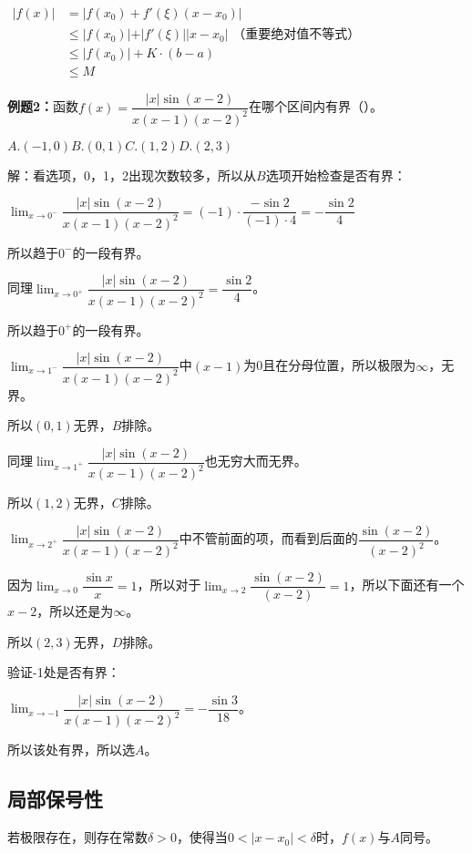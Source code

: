 \documentclass[UTF8]{ctexart}
\begin{document}
$
\begin{aligned}
    \vert f(x)\vert & =\vert f(x_0)+f'(\xi)(x-x_0)\vert \\
    & \leqslant\vert f(x_0)\vert+\vert f'(\xi)\vert\vert x-x_0\vert\text{ （重要绝对值不等式）} \\
    & \leqslant\vert f(x_0)\vert+K\cdot(b-a) \\
    & \leqslant M
\end{aligned}
$

\textbf{例题2：}函数$f(x)=\dfrac{\vert x\vert\sin(x-2)}{x(x-1)(x-2)^2}$在哪个区间内有界（）。

$A.(-1,0)$\qquad$B.(0,1)$\qquad$C.(1,2)$\qquad$D.(2,3)$

解：看选项，0，1，2出现次数较多，所以从$B$选项开始检查是否有界：

$\lim_{x\to 0^-}\dfrac{\vert x\vert\sin(x-2)}{x(x-1)(x-2)^2}=(-1)\cdot\dfrac{-\sin 2}{(-1)\cdot 4}=-\dfrac{\sin 2}{4}$

所以趋于$0^-$的一段有界。

同理$\lim_{x\to 0^+}\dfrac{\vert x\vert\sin(x-2)}{x(x-1)(x-2)^2}=\dfrac{\sin 2}{4}$。

所以趋于$0^+$的一段有界。

$\lim_{x\to 1^-}\dfrac{\vert x\vert\sin(x-2)}{x(x-1)(x-2)^2}$中$(x-1)$为0且在分母位置，所以极限为$\infty$，无界。

所以$(0,1)$无界，$B$排除。

同理$\lim_{x\to 1^+}\dfrac{\vert x\vert\sin(x-2)}{x(x-1)(x-2)^2}$也无穷大而无界。

所以$(1,2)$无界，$C$排除。

$\lim_{x\to 2^+}\dfrac{\vert x\vert\sin(x-2)}{x(x-1)(x-2)^2}$中不管前面的项，而看到后面的$\dfrac{\sin(x-2)}{(x-2)^2}$。

因为$\lim_{x\to 0}\dfrac{\sin x}{x}=1$，所以对于$\lim_{x\to 2}\dfrac{\sin(x-2)}{(x-2)}=1$，所以下面还有一个$x-2$，所以还是为$\infty$。

所以$(2,3)$无界，$D$排除。

验证-1处是否有界：

$\lim_{x\to -1}\dfrac{\vert x\vert\sin(x-2)}{x(x-1)(x-2)^2}=-\dfrac{\sin 3}{18}$。

所以该处有界，所以选$A$。

\subsection{局部保号性}

若极限存在，则存在常数$\delta>0$，使得当$0<\vert x-x_0\vert<\delta$时，$f(x)$与$A$同号。
\end{document}
